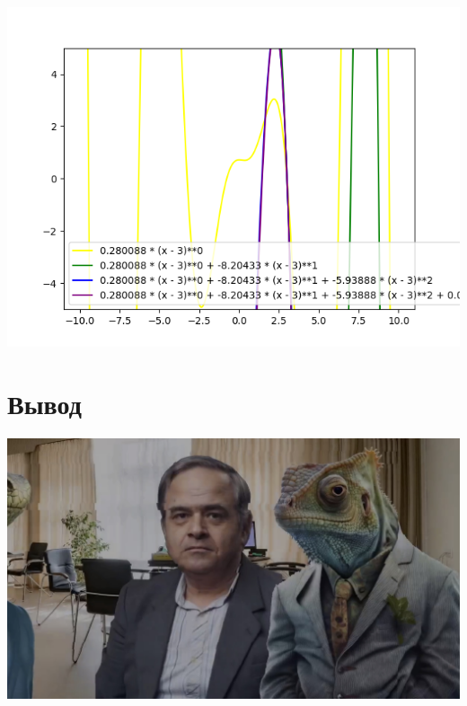 \documentclass[a4paper,14pt]{extarticle}
\begin{document}
\begin{center} \includegraphics[scale=0.6]{difference.png} \end{center}
\section{Вывод}\begin{center} \includegraphics[scale=0.2]{Petrovich.jpg} \end{center}
\end{document}

